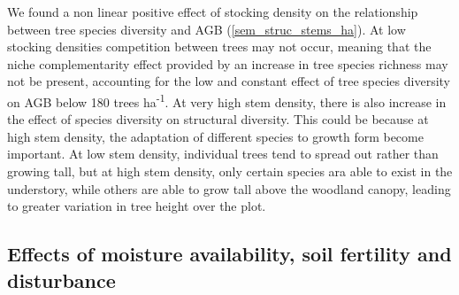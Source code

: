 \documentclass[11pt,a4paper]{article}
\newcommand{\textapprox}{\raisebox{0.5ex}{\texttildelow}}  %
\begin{document}
We found a non linear positive effect of stocking density on the relationship between tree species diversity and AGB (\autoref{sem_struc_stems_ha}). At low stocking densities competition between  trees may not occur, meaning that the niche complementarity effect provided by an increase in tree species richness may not be present, accounting for the low and constant effect of tree species diversity on AGB below \textapprox{}180 trees ha\textsuperscript{-1}. At very high stem density, there is also increase in the effect of species diversity on structural diversity. This could be because at high stem density, the adaptation of different species to growth form become important. At low stem density, individual trees tend to spread out rather than growing tall, but at high stem density, only certain species ara able to exist in the understory, while others are able to grow tall above the woodland canopy, leading to greater variation in tree height over the plot.

\subsection{Effects of moisture availability, soil fertility and disturbance}
\end{document}
